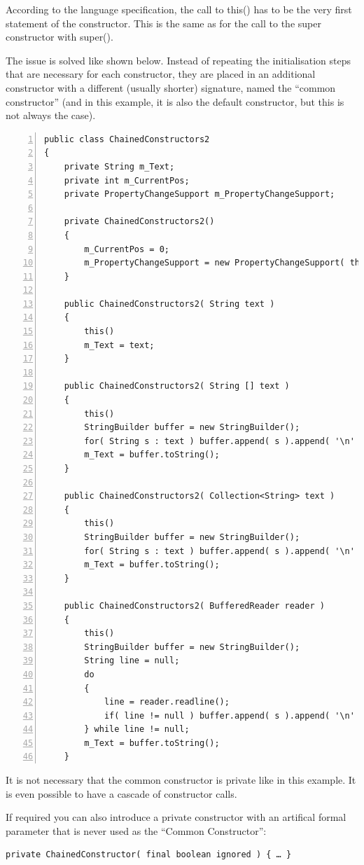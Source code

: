 \documentclass[11pt,a4paper, titlepage, parskip=half, headsepline, footsepline, cleardoublepage=current, headheight=1cm]{scrbook}
\begin{document}
According to the language specification, the call to this() has to be the very first statement of the constructor. This is the same as for the call to the super constructor with super().

The issue is solved like shown below. Instead of repeating the initialisation steps that are necessary for each constructor, they are placed in an additional constructor with a different (usually shorter) signature, named the “common constructor” (and in this example, it is also the default constructor, but this is not always the case).
\begin{lstlisting}[numbers=left]
public class ChainedConstructors2
{
    private String m_Text;
    private int m_CurrentPos;
    private PropertyChangeSupport m_PropertyChangeSupport;
    
    private ChainedConstructors2()
    {
        m_CurrentPos = 0;
        m_PropertyChangeSupport = new PropertyChangeSupport( this );
    }
    
    public ChainedConstructors2( String text )
    {
        this()
        m_Text = text;
    }
    
    public ChainedConstructors2( String [] text )
    {
        this()
        StringBuilder buffer = new StringBuilder();
        for( String s : text ) buffer.append( s ).append( '\n' );
        m_Text = buffer.toString();
    }
    
    public ChainedConstructors2( Collection<String> text )
    {
        this()
        StringBuilder buffer = new StringBuilder();
        for( String s : text ) buffer.append( s ).append( '\n' );
        m_Text = buffer.toString();
    }
    
    public ChainedConstructors2( BufferedReader reader )
    {
        this()
        StringBuilder buffer = new StringBuilder();
        String line = null;
        do
        {
            line = reader.readline();
            if( line != null ) buffer.append( s ).append( '\n' );
        } while line != null;
        m_Text = buffer.toString();
    }
\end{lstlisting}
It is not necessary that the common constructor is private like in this example. It is even possible to have a cascade of constructor calls.

If required you can also introduce a private constructor with an artifical formal parameter that is never used as the “Common Constructor”:
\begin{lstlisting}
private ChainedConstructor( final boolean ignored ) { … }
\end{lstlisting}
\end{document}
